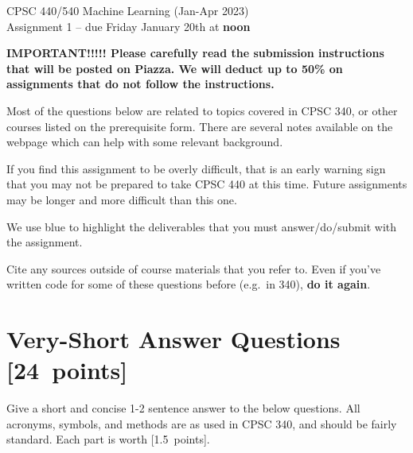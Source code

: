 \documentclass{article}
\newcommand{\ask}[1]{\textcolor{question}{#1}}
\newcommand{\pts}[1]{\textcolor{points}{[#1~points]}}
\begin{document}
\begin{center}
\Large
CPSC 440/540 Machine Learning (Jan-Apr 2023)\\
Assignment 1 --
due Friday January 20th at \textbf{noon}
\end{center}



\textbf{IMPORTANT!!!!! Please carefully read the submission instructions that will be posted on Piazza. We will deduct up to 50\% on assignments that do not follow the instructions.}

Most of the questions below are related to topics covered in CPSC 340, or other courses listed on the prerequisite form. There are several notes available on the webpage which can help with some relevant background.

If you find this assignment to be overly difficult, that is an early warning sign that you may not be prepared to take CPSC 440
at this time. Future assignments may be longer and more difficult than this one.

We use \ask{blue} to highlight the deliverables that you must answer/do/submit with the assignment.

Cite any sources outside of course materials that you refer to.
Even if you've written code for some of these questions before (e.g.\ in 340),
\textbf{do it again}.



\clearpage
\section{Very-Short Answer Questions \pts{24}}

Give a short and concise 1-2 sentence answer to the below questions.
All acronyms, symbols, and methods are as used in CPSC 340, and should be fairly standard.
Each part is worth \pts{1.5}.
\end{document}
